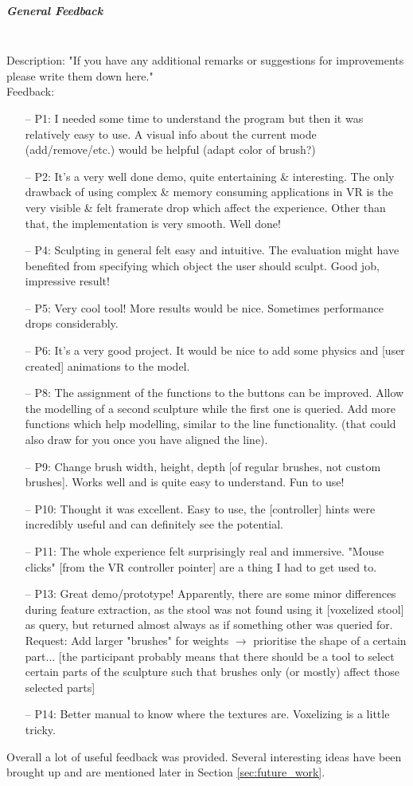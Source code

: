 \subparagraph{General Feedback} \hfill \\
Description: "If you have any additional remarks or suggestions for improvements please write them down here."\\
Feedback:
\begin{enumerate} \setlength\itemsep{-0.5em}
	\item[--] P1: I needed some time to understand the program but then it was relatively easy to use. A visual info about the current mode (add/remove/etc.) would be helpful (adapt color of brush?)
	\item[--] P2: It's a very well done demo, quite entertaining \& interesting. The only drawback of using complex \& memory consuming applications in VR is the very visible \& felt framerate drop which affect the experience. Other than that, the implementation is very smooth. Well done!
	\item[--] P4: Sculpting in general felt easy and intuitive. The evaluation might have benefited from specifying which object the user should sculpt. Good job, impressive result!
	\item[--] P5: Very cool tool! More results would be nice. Sometimes performance drops considerably.
	\item[--] P6: It's a very good project. It would be nice to add some physics and [user created] animations to the model.
	\item[--] P8: The assignment of the functions to the buttons can be improved. Allow the modelling of a second sculpture while the first one is queried. Add more functions which help modelling, similar to the line functionality. (that could also draw for you once you have aligned the line).
	\item[--] P9: Change brush width, height, depth [of regular brushes, not custom brushes]. Works well and is quite easy to understand. Fun to use!
	\item[--] P10: Thought it was excellent. Easy to use, the [controller] hints were incredibly useful and can definitely see the potential.
	\item[--] P11: The whole experience felt surprisingly real and immersive. "Mouse clicks" [from the VR controller pointer] are a thing I had to get used to.
	\item[--] P13: Great demo/prototype! Apparently, there are some minor differences during feature extraction, as the stool was not found using it [voxelized stool] as query, but returned almost always as if something other was queried for. Request: Add larger "brushes" for weights $\rightarrow$ prioritise the shape of a certain part... [the participant probably means that there should be a tool to select certain parts of the sculpture such that brushes only (or mostly) affect those selected parts]
	\item[--] P14: Better manual to know where the textures are. Voxelizing is a little tricky.
\end{enumerate}

Overall a lot of useful feedback was provided. Several interesting ideas have been brought up and are mentioned later in Section \ref{sec:future_work}.